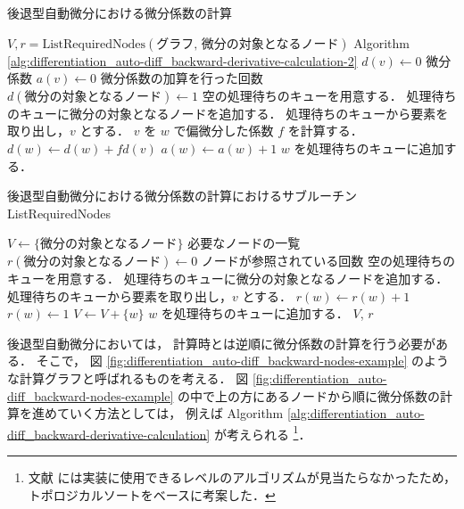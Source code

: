 \begin{algorithm}[tp]
    \caption{後退型自動微分における微分係数の計算}
    \label{alg:differentiation_auto-diff_backward-derivative-calculation}
    \begin{algorithmic}[1]
        \State $V, r = \text{ListRequiredNodes}(\text{グラフ, 微分の対象となるノード})$
        \Comment Algorithm \ref{alg:differentiation_auto-diff_backward-derivative-calculation-2}
        \State $d(v) \gets 0$ \Comment 微分係数
        \State $a(v) \gets 0$ \Comment 微分係数の加算を行った回数
        \EndFor
        \State $d(\text{微分の対象となるノード}) \gets 1$
        \State 空の処理待ちのキューを用意する．
        \State 処理待ちのキューに微分の対象となるノードを追加する．
        \State 処理待ちのキューから要素を取り出し，$v$ とする．
        \State $v$ を $w$ で偏微分した係数 $f$ を計算する．
        \State $d(w) \gets d(w) + f d(v)$
        \State $a(w) \gets a(w) + 1$
        \State $w$ を処理待ちのキューに追加する．
        \EndIf
        \EndFor
        \EndWhile
        \EndProcedure
    \end{algorithmic}
\end{algorithm}
\begin{algorithm}[tp]
    \caption{後退型自動微分における微分係数の計算におけるサブルーチン ListRequiredNodes}
    \label{alg:differentiation_auto-diff_backward-derivative-calculation-2}
    \begin{algorithmic}[1]
        \State $V \gets \{\text{微分の対象となるノード}\}$ \Comment 必要なノードの一覧
        \State $r(\text{微分の対象となるノード}) \gets 0$ \Comment ノードが参照されている回数
        \State 空の処理待ちのキューを用意する．
        \State 処理待ちのキューに微分の対象となるノードを追加する．
        \State 処理待ちのキューから要素を取り出し，$v$ とする．
        \State $r(w) \gets r(w) + 1$
        \Else
        \State $r(w) \gets 1$
        \EndIf
        \State $V \gets V + \{w\}$
        \State $w$ を処理待ちのキューに追加する．
        \EndIf
        \EndFor
        \EndWhile
        \State \Return $V$, $r$
        \EndProcedure
    \end{algorithmic}
\end{algorithm}

後退型自動微分においては，
計算時とは逆順に微分係数の計算を行う必要がある．
そこで，
図 \ref{fig:differentiation_auto-diff_backward-nodes-example}
のような計算グラフと呼ばれるものを考える\cite{Kubota1998}．
図 \ref{fig:differentiation_auto-diff_backward-nodes-example}
の中で上の方にあるノードから順に微分係数の計算を進めていく方法としては，
例えば
Algorithm \ref{alg:differentiation_auto-diff_backward-derivative-calculation}
が考えられる
\footnote{文献 \cite{Kubota1998} には実装に使用できるレベルのアルゴリズムが見当たらなかったため，%
    トポロジカルソートをベースに考案した．}．
